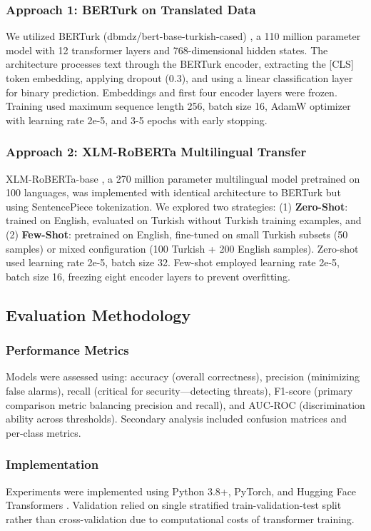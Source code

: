 \documentclass[conference]{IEEEtran}
\begin{document}
\subsubsection{Approach 1: BERTurk on Translated Data}
We utilized BERTurk (dbmdz/bert-base-turkish-cased) \cite{11}, a 110 million parameter model with 12 transformer layers and 768-dimensional hidden states. The architecture processes text through the BERTurk encoder, extracting the [CLS] token embedding, applying dropout (0.3), and using a linear classification layer for binary prediction. Embeddings and first four encoder layers were frozen. Training used maximum sequence length 256, batch size 16, AdamW optimizer with learning rate 2e-5, and 3-5 epochs with early stopping.

\subsubsection{Approach 2: XLM-RoBERTa Multilingual Transfer}
XLM-RoBERTa-base \cite{10}, a 270 million parameter multilingual model pretrained on 100 languages, was implemented with identical architecture to BERTurk but using SentencePiece tokenization. We explored two strategies: (1) \textbf{Zero-Shot}: trained on English, evaluated on Turkish without Turkish training examples, and (2) \textbf{Few-Shot}: pretrained on English, fine-tuned on small Turkish subsets (50 samples) or mixed configuration (100 Turkish + 200 English samples). Zero-shot used learning rate 2e-5, batch size 32. Few-shot employed learning rate 2e-5, batch size 16, freezing eight encoder layers to prevent overfitting.

\subsection{Evaluation Methodology}

\subsubsection{Performance Metrics}
Models were assessed using: accuracy (overall correctness), precision (minimizing false alarms), recall (critical for security—detecting threats), F1-score (primary comparison metric balancing precision and recall), and AUC-ROC (discrimination ability across thresholds). Secondary analysis included confusion matrices and per-class metrics.

\subsubsection{Implementation}
Experiments were implemented using Python 3.8+, PyTorch, and Hugging Face Transformers \cite{7}. Validation relied on single stratified train-validation-test split rather than cross-validation due to computational costs of transformer training.
\end{document}
